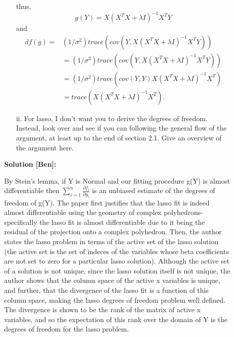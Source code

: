 \documentclass[11pt]{article}
\begin{document}
\begin{enumerate}
\begin{itemize}
\begin{itemize}
      thus, 
      \begin{equation*}
        g(Y)=X(X^TX+\lambda I)^{-1}X^TY
      \end{equation*}
      and 
      \begin{align*}
        df(g)=&(1/\sigma^2)trace(cov(Y,X(X^TX+\lambda I)^{-1}X^TY))\\
        &=(1/\sigma^2)trace(cov(Y,X(X^TX+\lambda I)^{-1}X^TY))\\
        &=(1/\sigma^2)trace(cov(Y,Y)X(X^TX+\lambda I)^{-1}X^T)\\
        &=trace(X(X^TX+\lambda I)^{-1}X^T). 
      \end{align*}

    \item[ii.] For lasso, I don't want you to derive the degrees of freedom.
      Instead, look over \cite{tibshirani2012degrees} and see if you can
      following the general flow of the argument, at least up to the end of
      section 2.1.  Give an overview of the argument here.
    \end{itemize}
    
    \textbf{Solution [Ben]:}

    By Stein's lemma, if Y is Normal and our fitting procedure g(Y) is almost
    differentiable then $\sum_{i=1}^n \frac{\partial f_i}{\partial y_i}$ is an
    unbiased estimate of the degrees of freedom of g(Y). The paper first
    justifies that the lasso fit is indeed almost differentiable using the
    geometry of complex polyhedrons- specifically the lasso fit is almost
    differentiable due to it being the residual of the projection onto a complex
    polyhedron. Then, the author states the lasso problem in terms of the active
    set of the lasso solution (the active set is the set of indeces of the
    variables whose beta coefficients are not set to zero for a particular lasso
    solution). Although the active set of a solution is not unique, since the
    lasso solution itself is not unique, the author shows that the column space
    of the active x variables is unique, and further, that the divergence of the
    lasso fit is a function of this column space, making the lasso degrees of
    freedom problem well defined. The divergence is shown to be the rank of the
    matrix of active x variables, and so the expectation of this rank over the
    domain of Y is the degrees of freedom for the lasso problem.



\end{itemize}
\end{enumerate}
\end{document}

